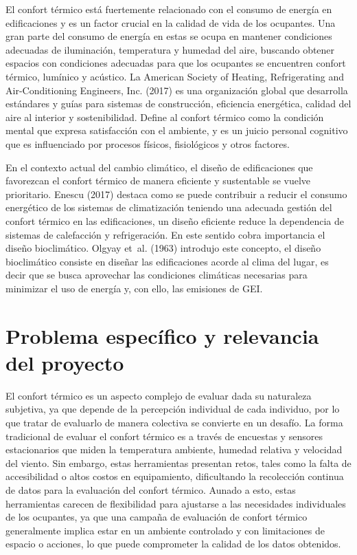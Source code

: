 \documentclass[
  12pt,
  letterpaper,
  DIV=11,
  numbers=noendperiod]{scrreport}
\begin{document}
El confort térmico está fuertemente relacionado con el consumo de
energía en edificaciones y es un factor crucial en la calidad de vida de
los ocupantes. Una gran parte del consumo de energía en estas se ocupa
en mantener condiciones adecuadas de iluminación, temperatura y humedad
del aire, buscando obtener espacios con condiciones adecuadas para que
los ocupantes se encuentren confort térmico, lumínico y acústico. La
American Society of Heating, Refrigerating and Air-Conditioning
Engineers, Inc. (2017) es una organización global que desarrolla
estándares y guías para sistemas de construcción, eficiencia energética,
calidad del aire al interior y sostenibilidad. Define al confort térmico
como la condición mental que expresa satisfacción con el ambiente, y es
un juicio personal cognitivo que es influenciado por procesos físicos,
fisiológicos y otros factores.

En el contexto actual del cambio climático, el diseño de edificaciones
que favorezcan el confort térmico de manera eficiente y sustentable se
vuelve prioritario. Enescu (2017) destaca como se puede contribuir a
reducir el consumo energético de los sistemas de climatización teniendo
una adecuada gestión del confort térmico en las edificaciones, un diseño
eficiente reduce la dependencia de sistemas de calefacción y
refrigeración. En este sentido cobra importancia el diseño bioclimático.
Olgyay et~al. (1963) introdujo este concepto, el diseño bioclimático
consiste en diseñar las edificaciones acorde al clima del lugar, es
decir que se busca aprovechar las condiciones climáticas necesarias para
minimizar el uso de energía y, con ello, las emisiones de GEI.

\hypertarget{problema-especuxedfico-y-relevancia-del-proyecto}{%
\section{Problema específico y relevancia del
proyecto}\label{problema-especuxedfico-y-relevancia-del-proyecto}}

El confort térmico es un aspecto complejo de evaluar dada su naturaleza
subjetiva, ya que depende de la percepción individual de cada individuo,
por lo que tratar de evaluarlo de manera colectiva se convierte en un
desafío. La forma tradicional de evaluar el confort térmico es a través
de encuestas y sensores estacionarios que miden la temperatura ambiente,
humedad relativa y velocidad del viento. Sin embargo, estas herramientas
presentan retos, tales como la falta de accesibilidad o altos costos en
equipamiento, dificultando la recolección continua de datos para la
evaluación del confort térmico. Aunado a esto, estas herramientas
carecen de flexibilidad para ajustarse a las necesidades individuales de
los ocupantes, ya que una campaña de evaluación de confort térmico
generalmente implica estar en un ambiente controlado y con limitaciones
de espacio o acciones, lo que puede comprometer la calidad de los datos
obtenidos.
\end{document}
